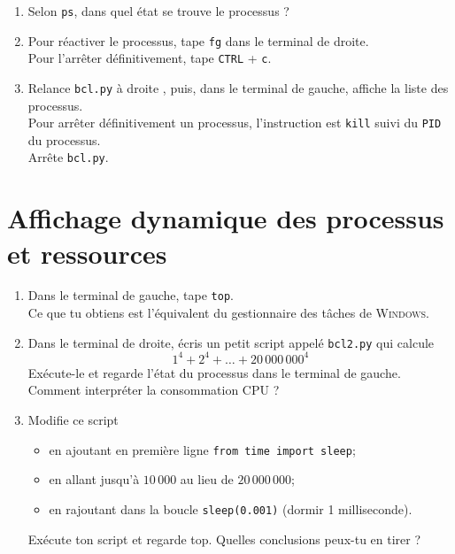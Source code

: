 \documentclass[12pt,a4paper,article,english,firamath]{nsi}
\begin{document}
\begin{enumerate}
    \item Selon \texttt{ps}, dans quel état se trouve le processus ?\\
          
    \item Pour réactiver le processus, tape \texttt{fg} dans le terminal de droite.\\
          Pour l'arrêter définitivement, tape \texttt{CTRL} + \texttt{c}.\\
          
    \item Relance \texttt{bcl.py} à droite , puis, dans le terminal de gauche, affiche la liste des processus.\\
          Pour arrêter définitivement un processus, l'instruction est \texttt{kill} suivi du \texttt{PID} du processus.\\
          Arrête \texttt{bcl.py}.
\end{enumerate}

\section*{Affichage dynamique des processus et ressources}
\begin{enumerate}
    \item Dans le terminal de gauche, tape \texttt{top}.\\
          Ce que tu obtiens est l'équivalent du gestionnaire des tâches de \textsc{Windows}.\\
          
    \item Dans le terminal de droite, écris un petit script appelé \texttt{bcl2.py} qui calcule
          $$1^4+2^4+\ldots+20\,000\,000^4$$
          Exécute-le et regarde l'état du processus dans le terminal de gauche. Comment interpréter la consommation CPU ?\\
          
    \item Modifie ce script
          \begin{itemize}
              \item en ajoutant en première ligne \texttt{from time import sleep};
              \item en allant jusqu'à $10\,000$ au lieu de $20\,000\,000$;
              \item en rajoutant dans la boucle \texttt{sleep(0.001)} (dormir 1 milliseconde).
          \end{itemize}
          Exécute ton script et regarde top. Quelles conclusions peux-tu en tirer ?
\end{enumerate}
\end{document}
